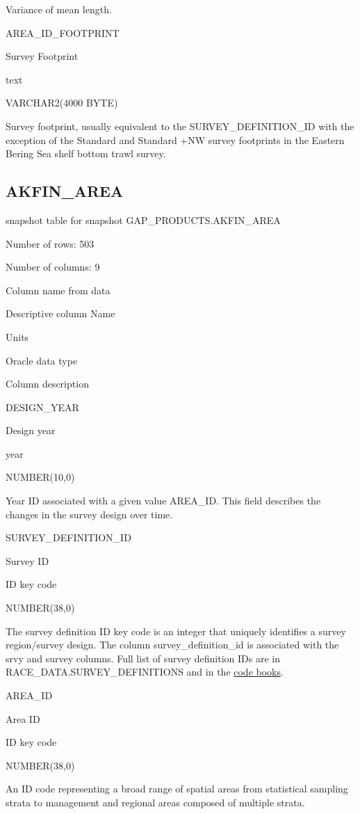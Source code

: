 \documentclass[
  letterpaper,
  oneside,
  open=any]{scrbook}
\begin{document}
Variance of mean length.

AREA\_ID\_FOOTPRINT

Survey Footprint

text

VARCHAR2(4000 BYTE)

Survey footprint, usually equivalent to the SURVEY\_DEFINITION\_ID with
the exception of the Standard and Standard +NW survey footprints in the
Eastern Bering Sea shelf bottom trawl survey.

\subsection{AKFIN\_AREA}\label{akfin_area}

snapshot table for snapshot GAP\_PRODUCTS.AKFIN\_AREA

Number of rows: 503

Number of columns: 9

Column name from data

Descriptive column Name

Units

Oracle data type

Column description

DESIGN\_YEAR

Design year

year

NUMBER(10,0)

Year ID associated with a given value AREA\_ID. This field describes the
changes in the survey design over time.

SURVEY\_DEFINITION\_ID

Survey ID

ID key code

NUMBER(38,0)

The survey definition ID key code is an integer that uniquely identifies
a survey region/survey design. The column survey\_definition\_id is
associated with the srvy and survey columns. Full list of survey
definition IDs are in RACE\_DATA.SURVEY\_DEFINITIONS and in the
\href{https://www.fisheries.noaa.gov/resource/document/groundfish-survey-species-code-manual-and-data-codes-manual}{code
books}.

AREA\_ID

Area ID

ID key code

NUMBER(38,0)

An ID code representing a broad range of spatial areas from statistical
sampling strata to management and regional areas composed of multiple
strata.
\end{document}
